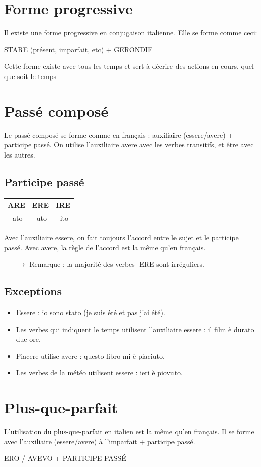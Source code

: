 \documentclass[12pt, openany]{report}
\begin{document}
\section{Forme progressive}
Il existe une forme progressive en conjugaison italienne. Elle se forme comme ceci: 
\begin{center}
    STARE (présent, imparfait, etc) + GERONDIF
\end{center}
Cette forme existe avec tous les temps et sert à décrire des actions en cours, quel que soit le temps  
\section{Passé composé}
Le passé composé se forme comme en français : auxiliaire (essere/avere) + participe passé. On utilise l'auxiliaire avere avec les verbes transitifs, et être avec les autres. 
\subsection{Participe passé}
\begin{center}
    \begin{tabular}{c|c|c}
        ARE & ERE & IRE\\ \hline
        -ato & -uto & -ito\\
    \end{tabular}
\end{center}
Avec l'auxiliaire essere, on fait toujours l'accord entre le sujet et le participe passé. Avec avere, la règle de l'accord est la même qu'en français. 
\begin{itemize}
    \item [$\to$] Remarque : la majorité des verbes -ERE sont irréguliers. 
\end{itemize}
\subsection{Exceptions}
\begin{itemize}
    \item Essere : io sono stato (je suis été et pas j'ai été).
    \item Les verbes qui indiquent le temps utilisent l'auxiliaire essere : il film è durato due ore.
    \item Piacere utilise avere : questo libro mi è piaciuto.
    \item Les verbes de la météo utilisent essere : ieri è piovuto.
\end{itemize}
\section{Plus-que-parfait}
L'utilisation du plus-que-parfait en italien est la même qu'en français. Il se forme avec l'auxiliaire (essere/avere) à l'imparfait + participe passé.
\begin{center}
    ERO / AVEVO + PARTICIPE PASSÉ
\end{center}
\end{document}
